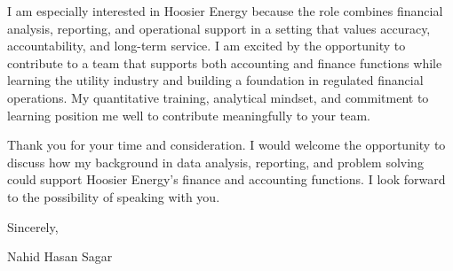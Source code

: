 \documentclass[10pt,letterpaper]{article}
\begin{document}
I am especially interested in Hoosier Energy because the role combines financial analysis, reporting, and operational support in a setting that values accuracy, accountability, and long-term service. I am excited by the opportunity to contribute to a team that supports both accounting and finance functions while learning the utility industry and building a foundation in regulated financial operations. My quantitative training, analytical mindset, and commitment to learning position me well to contribute meaningfully to your team.

Thank you for your time and consideration. I would welcome the opportunity to discuss how my background in data analysis, reporting, and problem solving could support Hoosier Energy's finance and accounting functions. I look forward to the possibility of speaking with you.

\vspace{1em}

Sincerely,\\
\vspace{1em}

Nahid Hasan Sagar
\end{document}
